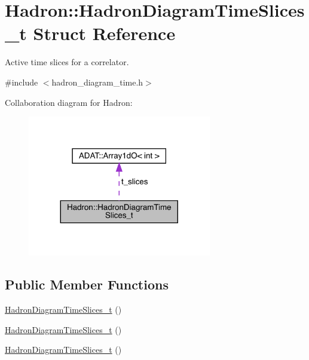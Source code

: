 \hypertarget{structHadron_1_1HadronDiagramTimeSlices__t}{}\section{Hadron\+:\+:Hadron\+Diagram\+Time\+Slices\+\_\+t Struct Reference}
\label{structHadron_1_1HadronDiagramTimeSlices__t}


Active time slices for a correlator.  




{\ttfamily \#include $<$hadron\+\_\+diagram\+\_\+time.\+h$>$}



Collaboration diagram for Hadron\+:\nopagebreak
\begin{figure}[H]
\begin{center}
\leavevmode
\includegraphics[width=227pt]{da/db5/structHadron_1_1HadronDiagramTimeSlices__t__coll__graph}
\end{center}
\end{figure}
\subsection*{Public Member Functions}
\begin{DoxyCompactItemize}
\item 
\mbox{\hyperlink{structHadron_1_1HadronDiagramTimeSlices__t_a2c90aaaf0112e21e3c3f065ac2d32682}{Hadron\+Diagram\+Time\+Slices\+\_\+t}} ()
\item 
\mbox{\hyperlink{structHadron_1_1HadronDiagramTimeSlices__t_a2c90aaaf0112e21e3c3f065ac2d32682}{Hadron\+Diagram\+Time\+Slices\+\_\+t}} ()
\item 
\mbox{\hyperlink{structHadron_1_1HadronDiagramTimeSlices__t_a2c90aaaf0112e21e3c3f065ac2d32682}{Hadron\+Diagram\+Time\+Slices\+\_\+t}} ()
\end{DoxyCompactItemize}
